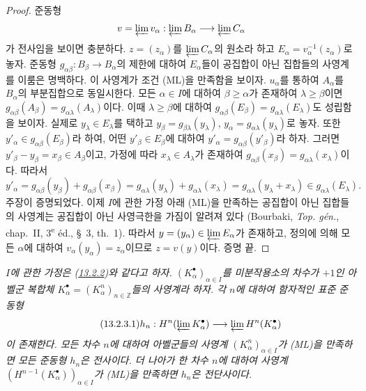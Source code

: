 \begin{proof}
준동형
\[
v=\varprojlim v_\alpha:\varprojlim B_\alpha\longrightarrow
\varprojlim C_\alpha
\]
가 전사임을 보이면 충분하다. $z=(z_\alpha)$를
$\varprojlim C_\alpha$의 원소라 하고
$E_\alpha=v_\alpha^{-1}(z_\alpha)$로 놓자. 준동형
$g_{\alpha\beta}:B_\beta\to B_\alpha$의 제한에 대하여
$E_\alpha$들이 공집합이 아닌 집합들의 사영계를 이룸은 명백하다.
이 사영계가 조건 (ML)을 만족함을 보이자. $u_\alpha$를 통하여
$A_\alpha$를 $B_\alpha$의 부분집합으로 동일시한다. 모든
$\alpha\in I$에 대하여 $\beta\geq\alpha$가 존재하여
$\lambda\geq\beta$이면
$g_{\alpha\beta}(A_\beta)=g_{\alpha\lambda}(A_\lambda)$이다. 이때
$\lambda\geq\beta$에 대하여
$g_{\alpha\beta}(E_\beta)=g_{\alpha\lambda}(E_\lambda)$도 성립함을
보이자. 실제로 $y_\lambda\in E_\lambda$를 택하고
$y_\beta=g_{\beta\lambda}(y_\lambda)$,
$y_\alpha=g_{\alpha\lambda}(y_\lambda)$로 놓자. 또한
$y'_\alpha\in g_{\alpha\beta}(E_\beta)$라 하여, 어떤
$y'_\beta\in E_\beta$에 대하여
$y'_\alpha=g_{\alpha\beta}(y'_\beta)$라 하자. 그러면
$y'_\beta-y_\beta=x_\beta\in A_\beta$이고, 가정에 따라
$x_\lambda\in A_\lambda$가 존재하여
$g_{\alpha\beta}(x_\beta)=g_{\alpha\lambda}(x_\lambda)$이다. 따라서
\[
y'_\alpha=g_{\alpha\beta}(y_\beta)+g_{\alpha\beta}(x_\beta)
=g_{\alpha\lambda}(y_\lambda)+g_{\alpha\lambda}(x_\lambda)
=g_{\alpha\lambda}(y_\lambda+x_\lambda)
\in g_{\alpha\lambda}(E_\lambda).
\]
주장이 증명되었다. 이제 $I$에 관한 가정 아래 (ML)을 만족하는 공집합이
아닌 집합들의 사영계는 공집합이 아닌 사영극한을 가짐이 알려져 있다
(Bourbaki, \emph{Top. gén.}, chap.~II, 3\textsuperscript{e} éd., §~3,
th.~1). 따라서 $y=(y_\alpha)\in\varprojlim E_\alpha$가 존재하고,
정의에 의해 모든 $\alpha$에 대하여 $v_\alpha(y_\alpha)=z_\alpha$이므로
$z=v(y)$이다. 증명 끝.
\end{proof}

\begin{proposition}[13.2.3]
\label{0.13.2.3-fr}
\emph{$I$에 관한 가정은 (\hyperref[0.13.2.2-fr]{13.2.2})와 같다고
하자. $(K_\alpha^\bullet)_{\alpha\in I}$를 미분작용소의 차수가 $+1$인
아벨군 복합체
$K_\alpha^\bullet=(K_\alpha^n)_{n\in\mathbb Z}$들의 사영계라 하자.
각 $n$에 대하여 함자적인 표준 준동형}
\begin{equation}
\label{0.13.2.3.1-fr}
\tag{13.2.3.1}
h_n:H^n(\varprojlim K_\alpha^\bullet)
\longrightarrow\varprojlim H^n(K_\alpha^\bullet)
\end{equation}
\emph{이 존재한다. 모든 차수 $n$에 대하여 아벨군들의 사영계
$(K_\alpha^n)_{\alpha\in I}$가 (ML)을 만족하면 모든 준동형 $h_n$은
전사이다. 더 나아가 한 차수 $n$에 대하여 사영계
$(H^{n-1}(K_\alpha^\bullet))_{\alpha\in I}$가 (ML)을 만족하면
$h_n$은 전단사이다.}
\end{proposition}

